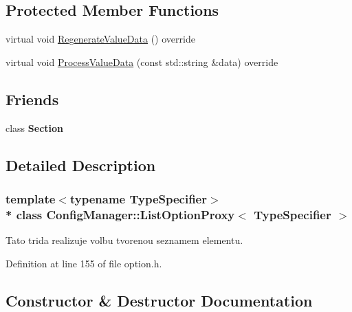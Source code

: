 \subsection*{Protected Member Functions}
\begin{DoxyCompactItemize}
\item 
virtual void \hyperlink{class_config_manager_1_1_list_option_proxy_ab7d04f2f12da920861c6cef6d8dca501}{Regenerate\+Value\+Data} () override
\item 
virtual void \hyperlink{class_config_manager_1_1_list_option_proxy_ade1da6bf53c9bef0806755e4f805284e}{Process\+Value\+Data} (const std\+::string \&data) override
\end{DoxyCompactItemize}
\subsection*{Friends}
\begin{DoxyCompactItemize}
\item 
class {\bfseries Section}\hypertarget{class_config_manager_1_1_list_option_proxy_a0bd6fc422149e1c8416770631b28d40c}{}\label{class_config_manager_1_1_list_option_proxy_a0bd6fc422149e1c8416770631b28d40c}

\end{DoxyCompactItemize}


\subsection{Detailed Description}
\subsubsection*{template$<$typename Type\+Specifier$>$\\*
class Config\+Manager\+::\+List\+Option\+Proxy$<$ Type\+Specifier $>$}

Tato trida realizuje volbu tvorenou seznamem elementu. 

Definition at line 155 of file option.\+h.



\subsection{Constructor \& Destructor Documentation}
